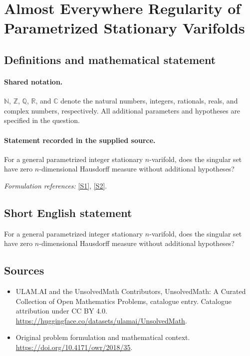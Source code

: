 \documentclass[11pt]{article}
\newcommand{\sref}[2]{\hyperlink{source:#1:#2}{[S#2]}}
\begin{document}
\section{Almost Everywhere Regularity of Parametrized Stationary Varifolds}\label{statement}

\subsection{Definitions and mathematical statement}

\paragraph{Shared notation.}$\mathbb N$, $\mathbb Z$, $\mathbb Q$, $\mathbb R$, and $\mathbb C$ denote the natural numbers, integers, rationals, reals, and complex numbers, respectively. All additional parameters and hypotheses are specified in the question.


\paragraph{Statement recorded in the supplied source.}
For a general parametrized integer stationary $n$-varifold, does the singular set have zero $n$-dimensional Hausdorff measure without additional hypotheses?
\par\smallskip\textit{Formulation references:} \sref{statement}{1}, \sref{statement}{2}.
\subsection{Short English statement}
For a general parametrized integer stationary $n$-varifold, does the singular set have zero $n$-dimensional Hausdorff measure without additional hypotheses?
\subsection{Sources}
\begin{itemize}
\item[\hypertarget{source:statement:1}{S1}] ULAM.AI and the UnsolvedMath Contributors, UnsolvedMath: A Curated Collection of Open Mathematics Problems, catalogue entry. Catalogue attribution under CC BY 4.0.
\url{https://huggingface.co/datasets/ulamai/UnsolvedMath}.
\item[\hypertarget{source:statement:2}{S2}] Original problem formulation and mathematical context.
\url{https://doi.org/10.4171/owr/2018/35}.
\end{itemize}
\label{end:statement}
\end{document}
